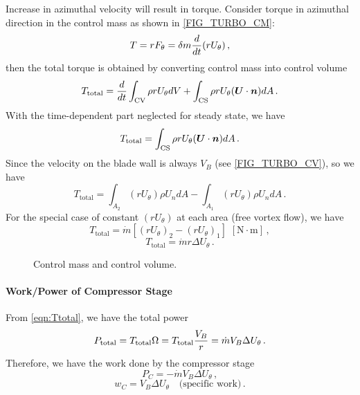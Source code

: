 Increase in azimuthal velocity will result in torque. Consider torque in azimuthal direction in the control mass as shown in \cref{FIG_TURBO_CM}:
\begin{equation}
  T = r F_\theta = \delta m {\frac{d}{dt}} (r U_\theta)\,,
\end{equation}
then the total torque is obtained by converting control mass into control volume
\begin{equation}
T_\text{total} = {\frac{d}{dt}} \int_\text{CV} \rho r U_\theta dV + \int_\text{CS} \rho r U_\theta ({\mbox{\boldmath$U$}} \cdot {\mbox{\boldmath$n$}}) dA\,.
\end{equation}
With the time-dependent part neglected for steady state, we have
\begin{equation}
T_\text{total} = \int_\text{CS} \rho r U_\theta ({\mbox{\boldmath$U$}} \cdot {\mbox{\boldmath$n$}}) dA\,.
\end{equation}
Since the velocity on the blade wall is always $V_B$ (see \cref{FIG_TURBO_CV}), so we have
\begin{equation}
T_\text{total} = \int_{A_2} ( r U_\theta ) \rho U_n dA - \int_{A_1} ( r U_\theta ) \rho U_n dA \,.
\end{equation}
For the special case of constant $(r U_\theta)$ at each area (free vortex flow), we have
\begin{equation}
  T_\text{total} = \dot{m} [(rU_\theta)_2-(rU_\theta)_1] \,\, [\text{N} \cdot \text{m}]\,,
\end{equation}
\begin{equation}
\label{eqn:Ttotal}
  T_\text{total} = \dot{m} r \Delta U_\theta\,.
\end{equation}

\begin{figure}[!htb!]
 \centering
    \quad
    \caption{\label{FIG_TURBO_CMCV}Control mass and control volume.}
\end{figure}

\paragraph*{Work/Power of Compressor Stage} From \cref{eqn:Ttotal}, we have the total power
\begin{equation}
  P_\text{total} = T_\text{total} \Omega = T_\text{total}{\frac{V_B}{r}} = \dot{m} V_B \Delta U_\theta\,.
\end{equation}
Therefore, we have the work done by the compressor stage
\begin{equation}
  P_C = -\dot{m} V_B \Delta U_\theta\,,
\end{equation}
\begin{equation}
\label{eqn:compressorWork}
  w_C = V_B \Delta U_\theta \quad \text{(specific work)}\,.
\end{equation}

